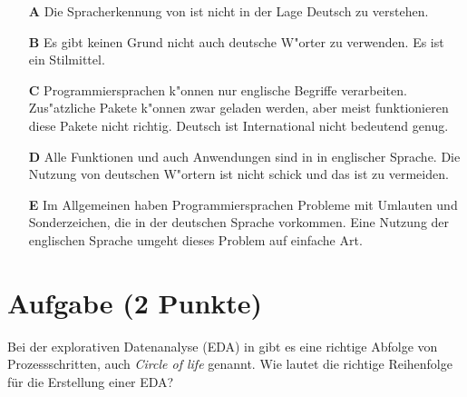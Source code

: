 \documentclass[a4paper, 10pt]{scrartcl}\usepackage[]{graphicx}\usepackage[]{xcolor}
\begin{document}
\begin{enumerate}
\item [\textbf{A} \msquare] Die Spracherkennung von \Rlogo ist nicht in der Lage Deutsch zu verstehen.
\item [\textbf{B} \msquare] Es gibt keinen Grund nicht auch deutsche W{"o}rter zu verwenden. Es ist ein Stilmittel.
\item [\textbf{C} \msquare] Programmiersprachen k{"o}nnen nur englische Begriffe verarbeiten. Zus{"a}tzliche Pakete k{"o}nnen zwar geladen werden, aber meist funktionieren diese Pakete nicht richtig. Deutsch ist International nicht bedeutend genug.
\item [\textbf{D} \msquare] Alle Funktionen und auch Anwendungen sind in \Rlogo in englischer Sprache. Die Nutzung von deutschen W{"o}rtern ist nicht schick und das ist zu vermeiden.
\item [\textbf{E} \msquare] Im Allgemeinen haben Programmiersprachen Probleme mit Umlauten und Sonderzeichen, die in der deutschen Sprache vorkommen. Eine Nutzung der englischen Sprache umgeht dieses Problem auf einfache Art.
\end{enumerate}

\section{Aufgabe \hfill (2 Punkte)}

Bei der explorativen Datenanalyse (EDA) in \Rlogo gibt es eine richtige Abfolge von Prozessschritten, auch \textit{Circle of life} genannt. Wie lautet die richtige Reihenfolge f{\"u}r die Erstellung einer EDA?
\end{document}
